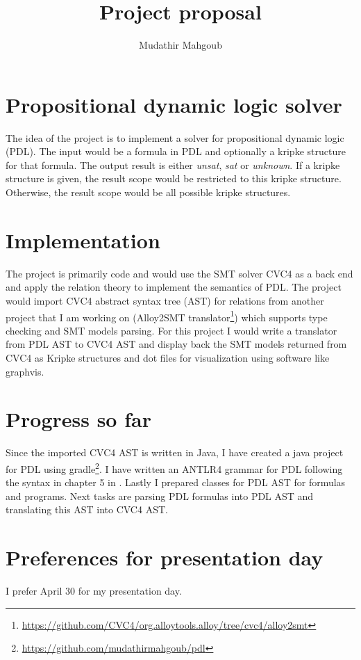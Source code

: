 \documentclass[12pt,a4paper]{article}
\author{Mudathir Mahgoub}
\title{Project proposal}
\begin{document}
\maketitle

\section{Propositional dynamic logic solver}
The idea of the project is to implement a solver for propositional dynamic logic (PDL). The input would be a formula in PDL and optionally a kripke structure for that formula. The output result is either \textit{unsat}, \textit{sat} or \textit{unknown}. If a kripke structure is given, the result scope would be restricted to this kripke structure. Otherwise, the result scope would be all possible kripke structures. 

\section{Implementation}
The project is primarily code and would use the SMT solver CVC4 as a back end and apply the relation theory to implement the semantics of PDL. The project would import CVC4 abstract syntax tree (AST) for relations from another project that I am working on (Alloy2SMT translator\footnote{\url{https://github.com/CVC4/org.alloytools.alloy/tree/cvc4/alloy2smt}}) which supports type checking and SMT models parsing. For this project I would write a translator from PDL AST to CVC4 AST and display back the SMT models returned from CVC4 as Kripke structures and dot files for visualization using software like graphvis.

\section{Progress so far}

Since the imported CVC4 AST is written in Java, I have created a java project for PDL  using gradle\footnote{\url{https://github.com/mudathirmahgoub/pdl}}. I have written an ANTLR4 grammar for PDL following the syntax in chapter 5 in \cite{dynamic}. Lastly I  prepared classes for PDL AST for formulas and programs. Next tasks are parsing PDL formulas  into PDL AST and translating this AST into CVC4 AST. 

\section{Preferences for presentation day}
I prefer April 30 for my presentation day.




\end{document}
